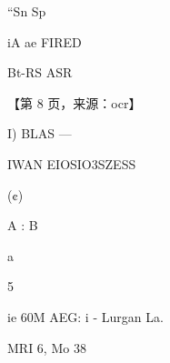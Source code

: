 \documentclass[UTF8,12pt,a4paper,openany]{ctexbook}
\begin{document}
\begin{enumerate}[label=\textbf{\arabic*.},leftmargin=2em]
                     “Sn Sp\par iA ae FIRED\par Bt-RS ASR\par \par 【第 8 页，来源：ocr】\par I) BLAS         —\par IWAN EIOSIO3SZESS\par (¢)\par A        :       B\par a\par 5\par ie 60M AEG: i - Lurgan La.\par MRI 6, Mo 38 
\end{enumerate}
\end{document}
